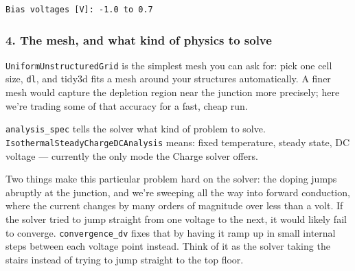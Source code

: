 \documentclass[11pt]{article}
\begin{document}
    \begin{Verbatim}[commandchars=\\\{\}]
Bias voltages [V]: -1.0 to 0.7
    \end{Verbatim}

    \clearpage
    \subsubsection{4. The mesh, and what kind of physics to
solve}\label{the-mesh-and-what-kind-of-physics-to-solve}

\texttt{UniformUnstructuredGrid} is the simplest mesh you can ask for:
pick one cell size, \texttt{dl}, and tidy3d fits a mesh around your
structures automatically. A finer mesh would capture the depletion
region near the junction more precisely; here we're trading some of that
accuracy for a fast, cheap run.

\texttt{analysis\_spec} tells the solver what kind of problem to solve.
\texttt{IsothermalSteadyChargeDCAnalysis} means: fixed temperature,
steady state, DC voltage --- currently the only mode the Charge solver
offers.

Two things make this particular problem hard on the solver: the doping
jumps abruptly at the junction, and we're sweeping all the way into
forward conduction, where the current changes by many orders of
magnitude over less than a volt. If the solver tried to jump straight
from one voltage to the next, it would likely fail to converge.
\texttt{convergence\_dv} fixes that by having it ramp up in small
internal steps between each voltage point instead. Think of it as the
solver taking the stairs instead of trying to jump straight to the top
floor.
\end{document}
